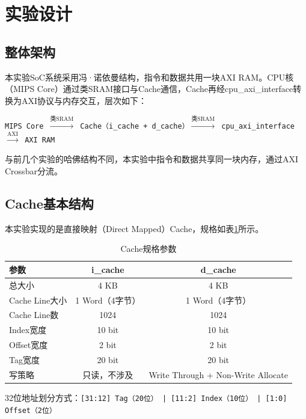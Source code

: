 \section{实验设计}

\subsection{整体架构}

本实验SoC系统采用冯·诺依曼结构，指令和数据共用一块AXI RAM。CPU核（MIPS Core）通过类SRAM接口与Cache通信，Cache再经cpu\_axi\_interface转换为AXI协议与内存交互，层次如下：

\begin{center}
\texttt{MIPS Core $\xrightarrow{\text{类SRAM}}$ Cache（i\_cache + d\_cache）$\xrightarrow{\text{类SRAM}}$ cpu\_axi\_interface $\xrightarrow{\text{AXI}}$ AXI RAM}
\end{center}

与前几个实验的哈佛结构不同，本实验中指令和数据共享同一块内存，通过AXI Crossbar分流。

\subsection{Cache基本结构}

本实验实现的是直接映射（Direct Mapped）Cache，规格如表\ref{tab:cache_spec}所示。

\begin{table}[htp]
\caption{Cache规格参数}
\label{tab:cache_spec}
\begin{center}
\begin{tabular}{|l|c|c|}
\hline
\textbf{参数} & \textbf{i\_cache} & \textbf{d\_cache} \\ \hline\hline
总大小        & 4 KB & 4 KB \\ \hline
Cache Line大小 & 1 Word（4字节） & 1 Word（4字节） \\ \hline
Cache Line数  & 1024 & 1024 \\ \hline
Index宽度     & 10 bit & 10 bit \\ \hline
Offset宽度    & 2 bit & 2 bit \\ \hline
Tag宽度       & 20 bit & 20 bit \\ \hline
写策略        & 只读，不涉及 & Write Through + Non-Write Allocate \\ \hline
\end{tabular}
\end{center}
\end{table}

32位地址划分方式：\texttt{[31:12] Tag（20位） | [11:2] Index（10位） | [1:0] Offset（2位）}

